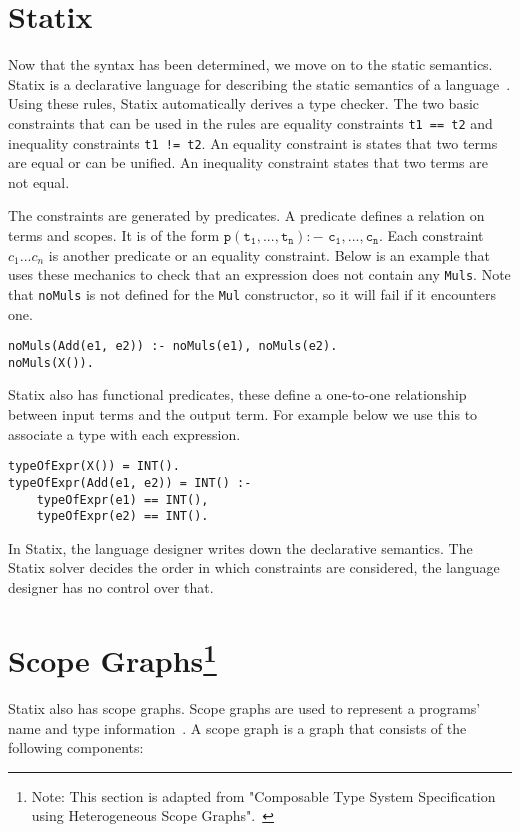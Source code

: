 \section{Statix}
Now that the syntax has been determined, we move on to the static semantics. Statix is a declarative language for describing the static semantics of a language~\cite{scopes_as_types}. Using these rules, Statix automatically derives a type checker.  The two basic constraints that can be used in the rules are equality constraints \verb|t1 == t2| and inequality constraints \verb|t1 != t2|. An equality constraint is states that two terms are equal or can be unified. An inequality constraint states that two terms are not equal. 

The constraints are generated by predicates. A predicate defines a relation on terms and scopes. It is of the form $\mathtt{p(t_1, ..., t_n) :-\,\,c_1, ..., c_n}$. Each constraint $c_1...c_n$ is another predicate or an equality constraint. Below is an example that uses these mechanics to check that an expression does not contain any \verb|Muls|. Note that \verb|noMuls| is not defined for the \verb|Mul| constructor, so it will fail if it encounters one.
\begin{lstlisting}
noMuls(Add(e1, e2)) :- noMuls(e1), noMuls(e2).
noMuls(X()).
\end{lstlisting}

Statix also has functional predicates, these define a one-to-one relationship between input terms and the output term. For example below we use this to associate a type with each expression.
\begin{lstlisting}
typeOfExpr(X()) = INT().
typeOfExpr(Add(e1, e2)) = INT() :-
	typeOfExpr(e1) == INT(),
	typeOfExpr(e2) == INT().
\end{lstlisting}

In Statix, the language designer writes down the declarative semantics. The Statix solver decides the order in which constraints are considered, the language designer has no control over that.

\section[Scope graphs]{\label{sec:statix}Scope Graphs\protect\footnote{Note: This section is adapted from "Composable Type System Specification using Heterogeneous Scope Graphs".~\cite[sect. 4.1.2]{Zwaan21}}}

Statix also has scope graphs. Scope graphs are used to represent a programs' name and type information~\cite{scopes_as_types, nameres}. A scope graph is a graph that consists of the following components:

